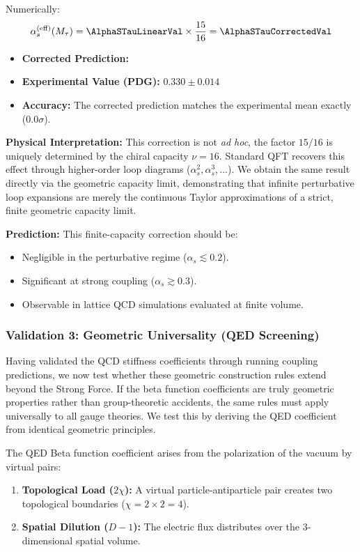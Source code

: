 Numerically:
\begin{equation}
\alpha_s^{\text{(eff)}}(M_\tau) = \AlphaSTauLinearVal \times \frac{15}{16} = \mathbf{\AlphaSTauCorrectedVal}
\end{equation}

\begin{itemize}
    \item \textbf{Corrected Prediction:} \AlphaSTauCorrectedVal
    \item \textbf{Experimental Value (PDG):} $0.330 \pm 0.014$
    \item \textbf{Accuracy:} The corrected prediction matches the experimental mean exactly ($0.0\sigma$).
\end{itemize}

\textbf{Physical Interpretation:} This correction is not \textit{ad hoc}, the factor $15/16$ is uniquely determined by the chiral capacity $\nu=16$. Standard QFT recovers this effect through higher-order loop diagrams ($\alpha_s^2, \alpha_s^3, \ldots$). We obtain the same result directly via the geometric capacity limit, demonstrating that infinite perturbative loop expansions are merely the continuous Taylor approximations of a strict, finite geometric capacity limit.

\textbf{Prediction:} This finite-capacity correction should be:
\begin{itemize}
    \item Negligible in the perturbative regime ($\alpha_s \lesssim 0.2$).
    \item Significant at strong coupling ($\alpha_s \gtrsim 0.3$).
    \item Observable in lattice QCD simulations evaluated at finite volume.
\end{itemize}
\subsubsection{Validation 3: Geometric Universality (QED Screening)}

Having validated the QCD stiffness coefficients through running coupling predictions, we now test whether these geometric construction rules extend beyond the Strong Force. If the beta function coefficients are truly geometric properties rather than group-theoretic accidents, the same rules must apply universally to all gauge theories. We test this by deriving the QED coefficient from identical geometric principles.

The QED Beta function coefficient arises from the polarization of the vacuum by virtual pairs:
\begin{enumerate}
    \item \textbf{Topological Load ($2\chi$):} A virtual particle-antiparticle pair creates two topological boundaries ($\chi=2 \times 2 = 4$).
    \item \textbf{Spatial Dilution ($D-1$):} The electric flux distributes over the 3-dimensional spatial volume.
\end{enumerate}

